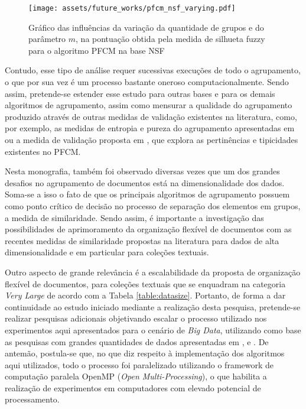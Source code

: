 \begin{figure}[!htb] \centering 
  \centering
  \texttt{[image: assets/future\_works/pfcm\_nsf\_varying.pdf]} 
  \caption{Gráfico das influências da variação da quantidade de grupos e do parâmetro $m$, na
pontuação obtida pela medida de silhueta fuzzy para o algoritmo PFCM na base NSF} 
  \label{fig:pfcmvarying}
\end{figure}

Contudo, esse tipo de análise requer
sucessivas execuções de todo o agrupamento, o que por sua vez é um processo bastante oneroso
computacionalmente. Sendo assim, pretende-se estender esse estudo para outras bases e para os
demais algoritmos de agrupamento, assim como mensurar a qualidade do agrupamento produzido
através de outras medidas de validação existentes na literatura, como, por exemplo, as medidas de
entropia e pureza do agrupamento apresentadas em  ou a medida de validação
proposta em , que explora as pertinências e tipicidades existentes no
PFCM.


Nesta monografia, também foi observado diversas vezes que um dos grandes desafios no agrupamento de
documentos está na dimensionalidade dos dados. Soma-se a isso o fato de que os principais algoritmos
de agrupamento possuem como ponto crítico de decisão no processo de separação dos elementos em
grupos, a medida de similaridade. Sendo assim, é importante a investigação das possibilidades de
aprimoramento da organização flexível de documentos com as recentes medidas de similaridade
propostas na literatura \cite{Lin2014,Nagwani2015} para dados de alta dimensionalidade e em
particular para coleções textuais.

Outro aspecto de grande relevância é a escalabilidade da proposta de organização flexível de
documentos, para coleções textuais que se enquadram na categoria {\it Very Large\/} de acordo com a
Tabela \ref{table:datasize}. Portanto, de forma a dar continuidade ao estudo iniciado mediante a
realização desta pesquisa, pretende-se realizar pesquisas adicionais objetivando escalar o processo
utilizado nos experimentos aqui apresentados para o cenário de {\it Big Data\/}, utilizando como
base as pesquisas com grandes quantidades de dados apresentadas em ,
 e . De antemão, postula-se que, no que diz respeito à
implementação dos algoritmos aqui utilizados, todo o processo foi paralelizado utilizando o
framework de computação paralela OpenMP ({\it Open Multi-Processing\/})\footnotemark, o que habilita
a realização de experimentos em computadores com elevado potencial de processamento.

